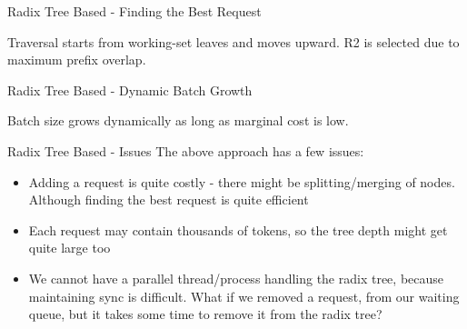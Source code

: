 \documentclass[Serif, 10pt, brown]{beamer}
\theoremstyle{example}
\theoremstyle{plain}
\begin{document}
\begin{frame}{Radix Tree Based - Finding the Best Request}
\centering
{}

\vspace{1em}
\small
Traversal starts from working-set leaves and moves upward.  
R2 is selected due to maximum prefix overlap.
\end{frame}


\begin{frame}{Radix Tree Based - Dynamic Batch Growth}
\centering
{}

\vspace{1em}
\small
Batch size grows dynamically as long as marginal cost is low.
\end{frame}

\begin{frame}{Radix Tree Based - Issues}
    The above approach has a few issues:
    \begin{itemize}
        \item Adding a request is quite costly - there might be splitting/merging of nodes. Although finding the best request is quite efficient
        \item Each request may contain thousands of tokens, so the tree depth might get quite large too
        \item We cannot have a parallel thread/process handling the radix tree, because maintaining sync is difficult. What if we removed a request, from our waiting queue, but it takes some time to remove it from the radix tree?
    \end{itemize}
\end{frame}
\end{document}
